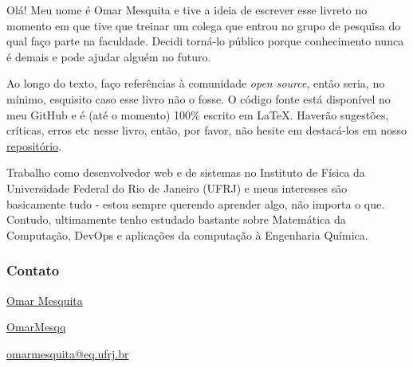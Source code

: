 \documentclass{article}
\begin{document}
  Olá! Meu nome é Omar Mesquita e tive a ideia de escrever esse livreto no momento em que tive que treinar um colega que entrou 
  no grupo de pesquisa do qual faço parte na faculdade. Decidi torná-lo público porque conhecimento nunca é demais 
  e pode ajudar alguém no futuro. 

  Ao longo do texto, faço referências à comunidade \textit{open source}, então seria, no mínimo, esquisito caso esse livro não o fosse.
  O código fonte está disponível no meu GitHub e é (até o momento) 100\% escrito em \LaTeX. Haverão sugestões, críticas, erros etc nesse livro, 
  então, por favor, não hesite em destacá-los em nosso \href{https://github.com/OmarMesqq/livro}{repositório}. 

  
  Trabalho como desenvolvedor web e de sistemas no Instituto de Física da Universidade Federal do Rio de Janeiro (UFRJ) e meus 
  interesses são basicamente tudo - estou sempre querendo aprender algo, não importa o que. Contudo, ultimamente tenho estudado 
  bastante sobre Matemática da Computação, DevOps e aplicações da computação à Engenharia Química.

  \subsubsection{Contato}

   \hspace{1ex} \href{https://www.linkedin.com/in/omar-mesquita/}{Omar Mesquita}


  	\hspace{1ex} \href{https://github.com/OmarMesqq}{OmarMesqq}
  
 
   \hspace{1ex} \href{mailto:omarmesquita@eq.ufrj.br}{omarmesquita@eq.ufrj.br}
  
\end{document}
